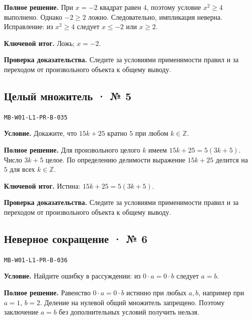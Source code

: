 \documentclass[11pt,a4paper,openany]{book}
\newcommand{\muid}[1]{\texttt{\footnotesize #1}}
\begin{document}
\textbf{Полное решение.} При $x=-2$ квадрат равен $4$, поэтому условие $x^2\ge4$ выполнено. Однако $-2\ge2$ ложно. Следовательно, импликация неверна. Исправление: из $x^2\ge4$ следует $x\le-2$ или $x\ge2$.


\begin{learnbox}\textbf{Ключевой итог.} Ложь; $x=-2$.\par \textbf{Проверка доказательства.} 
Следите за условиями применимости правил и за переходом от произвольного объекта к общему выводу. 
\end{learnbox}

\subsection*{Целый множитель · № 5}\hypertarget{solution:MB-W01-L1-PR-B-035}{}

\muid{MB-W01-L1-PR-B-035}\par

\textbf{Условие.} Докажите, что $15k+25$ кратно $5$ при любом $k\in\mathbb Z$.\par

\textbf{Полное решение.} Для произвольного целого $k$ имеем $15k+25=5(3k+5)$. Число $3k+5$ целое. По определению делимости выражение $15k+25$ делится на $5$ для всех $k\in\mathbb Z$.


\begin{learnbox}\textbf{Ключевой итог.} Истина: $15k+25=5(3k+5)$.\par \textbf{Проверка доказательства.} 
Следите за условиями применимости правил и за переходом от произвольного объекта к общему выводу. 
\end{learnbox}

\subsection*{Неверное сокращение · № 6}\hypertarget{solution:MB-W01-L1-PR-B-036}{}

\muid{MB-W01-L1-PR-B-036}\par

\textbf{Условие.} Найдите ошибку в рассуждении: из $0\cdot a=0\cdot b$ следует $a=b$.\par

\textbf{Полное решение.} Равенство $0\cdot a=0\cdot b$ истинно при любых $a,b$, например при $a=1$, $b=2$. Деление на нулевой общий множитель запрещено. Поэтому заключение $a=b$ без дополнительных условий получить нельзя.
\end{document}
